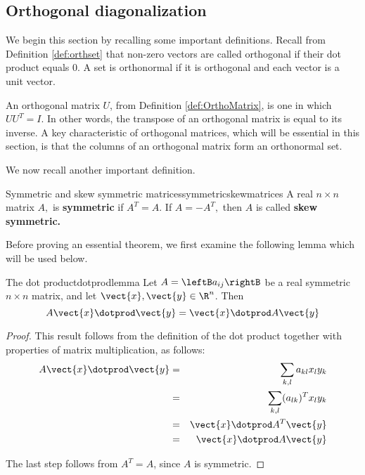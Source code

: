 \subsection{Orthogonal diagonalization}

We begin this section by recalling some important definitions. Recall from Definition \ref{def:orthset} that non-zero vectors are called orthogonal if their dot product equals $0$.  A set is orthonormal if it is orthogonal and each vector is a unit vector. 

An orthogonal matrix $U$, from Definition \ref{def:OrthoMatrix}, is one in which $UU^{T} = I$. In other words, the transpose of an orthogonal matrix is equal to its inverse. A key characteristic of orthogonal matrices, which will be essential in this section, is that the columns of an orthogonal matrix form an orthonormal set. 

We now recall another important definition. 

\begin{definition}{Symmetric and skew symmetric matrices}{symmetricskewmatrices}
A real $n\times n$ matrix $A,$ is \textbf{symmetric }if $A^{T}=A.$ If $%
A=-A^{T},$ then $A$ is called \textbf{skew symmetric. }
\end{definition}

Before proving an essential theorem, we first examine the following lemma which will be used below.

\begin{lemma}{The dot product}{dotprodlemma}
Let $A=\leftB a_{ij} \rightB$ be a real symmetric $n \times n$ matrix, and let $\vect{x}, \vect{y} \in \R^n$. Then
\[
A\vect{x} \dotprod \vect{y} = \vect{x} \dotprod A \vect{y}
\]
\end{lemma}

\begin{proof}
This result follows from the definition of the dot product together with properties of matrix multiplication, as follows:
\begin{eqnarray*}
A\vect{x} \dotprod \vect{y} &=& \sum_{k,l}a_{kl}x_{l}y_{k} \\
&=&\sum_{k,l} (a_{lk})^Tx_{l}y_{k} \\
&=& \vect{x}\dotprod A^{T}\vect{y} \\
&=& \vect{x}\dotprod A \vect{y}
\end{eqnarray*}

The last step follows from $A^T = A$, since $A$ is symmetric. 
\end{proof}

